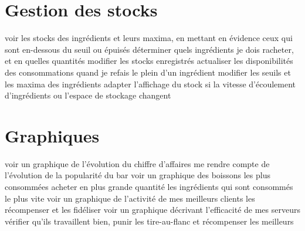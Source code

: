 \documentclass[a4paper,10pt]{article}
\begin{document}
\section{Gestion des stocks}

{voir les stocks des ingrédients et leurs maxima, en mettant en évidence ceux qui sont en-dessous du seuil ou épuisés}
{déterminer quels ingrédients je dois racheter, et en quelles quantités}
{modifier les stocks enregistrés}
{actualiser les disponibilités des consommations quand je refais le plein d'un ingrédient}
{modifier les seuils et les maxima des ingrédients}
{adapter l'affichage du stock si la vitesse d'écoulement d'ingrédients ou l'espace de stockage changent}

\section{Graphiques}

{voir un graphique de l'évolution du chiffre d'affaires}
{me rendre compte de l'évolution de la popularité du bar}
{voir un graphique des boissons les plus consommées}
{acheter en plus grande quantité les ingrédients qui sont consommés le plus vite}
{voir un graphique de l'activité de mes meilleurs clients}
{les récompenser et les fidéliser}
{voir un graphique décrivant l'efficacité de mes serveurs}
{vérifier qu'ils travaillent bien, punir les tire-au-flanc et récompenser les meilleurs}
\end{document}
